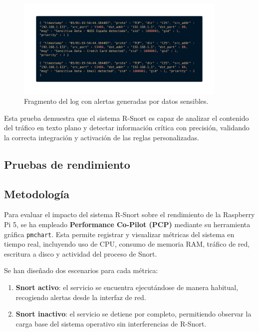 \documentclass[11pt,a4paper,twoside]{report}
\begin{document}
\begin{figure}[H]
	\centering
	\includegraphics[width=0.9\textwidth]{pruebas_bien/seccion_uno/5.png}
	\caption{Fragmento del log con alertas generadas por datos sensibles.}
\end{figure}

Esta prueba demuestra que el sistema R-Snort es capaz de analizar el contenido del tráfico en texto plano y detectar información crítica con precisión, validando la correcta integración y activación de las reglas personalizadas.


\subsection{Pruebas de rendimiento}

\subsection*{Metodología}

Para evaluar el impacto del sistema R-Snort sobre el rendimiento de la Raspberry Pi 5, se ha empleado \textbf{Performance Co-Pilot (PCP)}\cite{pcp_project} mediante su herramienta gráfica \texttt{pmchart}. Esta permite registrar y visualizar métricas del sistema en tiempo real, incluyendo uso de CPU, consumo de memoria RAM, tráfico de red, escritura a disco y actividad del proceso de Snort.\newline

Se han diseñado dos escenarios para cada métrica:
\begin{enumerate}
	\item \textbf{Snort activo}: el servicio se encuentra ejecutándose de manera habitual, recogiendo alertas desde la interfaz de red.
	\item \textbf{Snort inactivo}: el servicio se detiene por completo, permitiendo observar la carga base del sistema operativo sin interferencias de R-Snort.
\end{enumerate}
\end{document}
